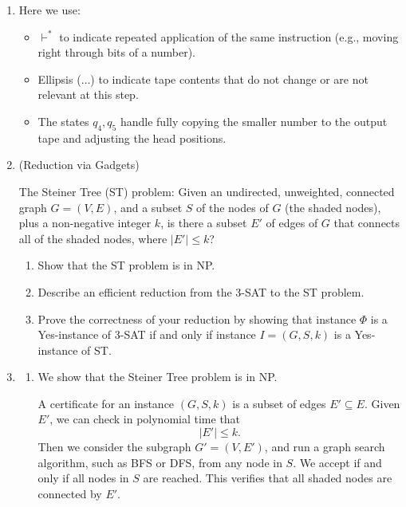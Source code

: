 \documentclass[12pt,a4paper]{article}
\makeatletter
\newtheorem*{solution}{Solution}
\theoremstyle{definition}
\renewenvironment{solution}[1][Solution] {\par\pushQED{\qed}\normalfont\topsep6\p@\@plus6\p@\relax\trivlist\item[\hskip\labelsep\bfseries#1\@addpunct{.}]\ignorespaces}{\popQED\endtrivlist\@endpefalse} \makeatother
\makeatother
\begin{document}
\begin{enumerate}
\begin{solution}
\begin{enumerate}
        \medskip
        Here we use:
        \begin{itemize}
            \item \(\vdash^*\) to indicate repeated application of the same instruction (e.g., moving right through bits of a number).
            \item Ellipsis (\(\dots\)) to indicate tape contents that do not change or are not relevant at this step.
            \item The states \(q_4, q_5\) handle fully copying the smaller number to the output tape and adjusting the head positions.
        \end{itemize}
                    
        \end{enumerate}
    \end{solution}
    
    
    \item {\color{purple}(Reduction via Gadgets)} 
    
    The Steiner Tree (ST) problem: Given an undirected, unweighted, connected graph $G = (V, E)$, and a subset $S$ of the nodes of $G$ (the shaded nodes), plus a non-negative integer $k$, is there a subset $E'$ of edges of $G$ that connects all of the shaded nodes, where $|E'| \leq k$?

    \begin{enumerate}
        \item Show that the ST problem is in NP.
        \item Describe an efficient reduction from the 3-SAT to the ST problem.
        
        \item Prove the correctness of your reduction by showing that instance $\Phi$ is a Yes-instance of 3-SAT if and only if instance $I = (G, S, k)$ is a Yes-instance of ST.
    \end{enumerate}


\begin{solution}
    \begin{enumerate}
        \item 
        We show that the Steiner Tree problem is in NP.

        A certificate for an instance \((G,S,k)\) is a subset of edges
        \(E'\subseteq E\). Given \(E'\), we can check in polynomial time that
        \[
        |E'|\leq k.
        \]
        Then we consider the subgraph \(G'=(V,E')\), and run a graph search
        algorithm, such as BFS or DFS, from any node in \(S\). We accept if and
        only if all nodes in \(S\) are reached. This verifies that all shaded
        nodes are connected by \(E'\).


\end{enumerate}
\end{solution}
\end{enumerate}
\end{document}
